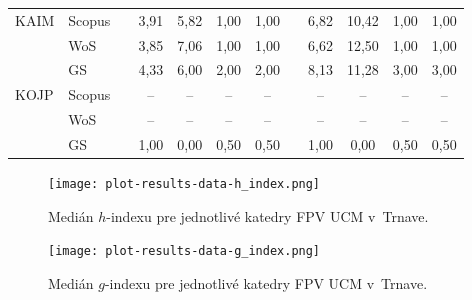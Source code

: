 \begin{table}
\begin{tabularx}{\textwidth}{XXp{1ex}ccccp{1ex}cccc}
    KAIM & Scopus & & 3,91  & 5,82  & 1,00  & 1,00  & & 6,82  & 10,42 & 1,00  & 1,00  \\
         & WoS    & & 3,85  & 7,06  & 1,00  & 1,00  & & 6,62  & 12,50 & 1,00  & 1,00  \\
         & GS     & & 4,33  & 6,00  & 2,00  & 2,00  & & 8,13  & 11,28 & 3,00  & 3,00  \\[1ex]
    KOJP & Scopus & & --    & --    & --    & --    & & --    & --    & --    & --    \\
         & WoS    & & --    & --    & --    & --    & & --    & --    & --    & --    \\
         & GS     & & 1,00  & 0,00  & 0,50  & 0,50  & & 1,00  & 0,00  & 0,50  & 0,50  \\
    \bottomrule
  \end{tabularx}
\end{table}

\begin{figure}
  \centering
  \texttt{[image: plot-results-data-h\_index.png]}
  \caption[Medián $h$-indexu pre jednotlivé katedry FPV UCM v~Trnave.]%
  {Medián $h$-indexu pre jednotlivé katedry FPV UCM v~Trnave.}
  \label{fig:h-index.plot}
\end{figure}

\begin{figure}
  \centering
  \texttt{[image: plot-results-data-g\_index.png]}
  \caption[Medián $g$-indexu pre jednotlivé katedry FPV UCM v~Trnave]%
  {Medián $g$-indexu pre jednotlivé katedry FPV UCM v~Trnave.}
  \label{fig:g-index.plot}
\end{figure}

